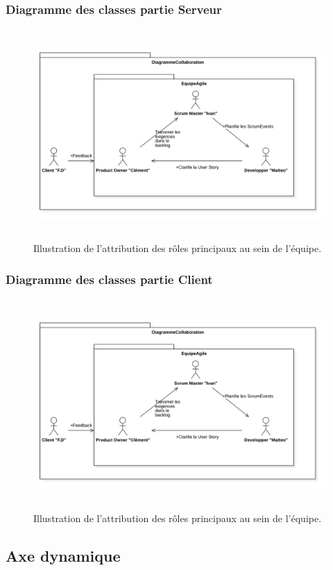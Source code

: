 \subsubsection{Diagramme des classes partie Serveur}
\begin{figure}[H]
	\centering
	\includegraphics[height=8cm]{img/diagCollaboration.png} 
	\caption{Illustration de l'attribution des rôles principaux au sein de l'équipe.}
\end{figure}

\subsubsection{Diagramme des classes partie Client}
\begin{figure}[H]
	\centering
	\includegraphics[height=8cm]{img/diagCollaboration.png} 
	\caption{Illustration de l'attribution des rôles principaux au sein de l'équipe.}
\end{figure}


\subsection{Axe dynamique}
